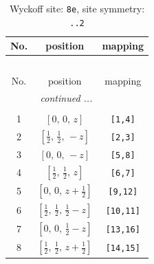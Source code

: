 \documentclass[fleqn,8pt]{jsarticle}
\begin{document}
\renewcommand{\arraystretch}{1.2}
\begin{longtable}{ccc}
\caption{Wyckoff site: {\tt 8e}, site symmetry: {\tt ..2}}
 \\
 \hline \hline
No. & position & mapping \\ \hline \endfirsthead

\multicolumn{2}{l}{\tablename\ \thetable{}} \\
 \hline \hline
No. & position & mapping \\ \hline \endhead

 \hline \hline
\multicolumn{2}{r}{\footnotesize\it continued ...} \\ \endfoot

 \hline \hline
\multicolumn{2}{r}{} \\ \endlastfoot

1 & $\left[ 0,\, 0,\, z \right]$ & {\tt [1,4]} \\ \hline
2 & $\left[ \frac{1}{2},\, \frac{1}{2},\, - z \right]$ & {\tt [2,3]} \\ \hline
3 & $\left[ 0,\, 0,\, - z \right]$ & {\tt [5,8]} \\ \hline
4 & $\left[ \frac{1}{2},\, \frac{1}{2},\, z \right]$ & {\tt [6,7]} \\ \hline
5 & $\left[ 0,\, 0,\, z + \frac{1}{2} \right]$ & {\tt [9,12]} \\ \hline
6 & $\left[ \frac{1}{2},\, \frac{1}{2},\, \frac{1}{2} - z \right]$ & {\tt [10,11]} \\ \hline
7 & $\left[ 0,\, 0,\, \frac{1}{2} - z \right]$ & {\tt [13,16]} \\ \hline
8 & $\left[ \frac{1}{2},\, \frac{1}{2},\, z + \frac{1}{2} \right]$ & {\tt [14,15]} \\
\end{longtable}
\renewcommand{\arraystretch}{1.2}
\end{document}
